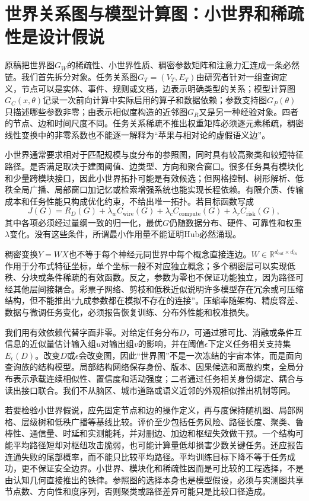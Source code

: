 \section{世界关系图与模型计算图：小世界和稀疏性是设计假说}

原稿把世界图$G_W$的稀疏性、小世界性质、稠密参数矩阵和注意力汇连成一条必然链。我们首先拆分对象。任务关系图$G_T=(V_T,E_T)$由研究者针对一组查询定义，节点可以是实体、事件、规则或文档，边表示明确类型的关系；模型计算图$G_C(x,\theta)$记录一次前向计算中实际启用的算子和数据依赖；参数支持图$G_P(\theta)$只描述哪些参数非零；由表示相似度构造的近邻图$G_R$又是另一种经验对象。四者的节点、边和时间尺度不同。任务关系稀疏不推出权重矩阵必须逐元素稀疏，稠密线性变换中的非零系数也不能逐一解释为“苹果与相对论的虚假语义边”。

小世界通常要求相对于匹配规模与度分布的参照图，同时具有较高聚类和较短特征路径。是否满足取决于建图阈值、边类型、方向和聚合窗口。很多任务具有模块化和少量跨模块接口，因此小世界拓扑可能是有效候选；但网格控制、树形解析、低秩全局广播、局部窗口加记忆或检索增强系统也能实现长程依赖。有限介质、传输成本和任务性能只构成优化约束，不给出唯一拓扑。若目标函数写成
\begin{equation}
 J(G)=R_{D}(G)+\lambda_w C_{\mathrm{wire}}(G)
 +\lambda_c C_{\mathrm{compute}}(G)+\lambda_r C_{\mathrm{risk}}(G),
\end{equation}
其中各项必须经过量纲一致的归一化，最优$G$仍随数据分布、硬件、可靠性和权重$\lambda$变化。没有这些条件，所谓最小作用量不能证明Hub必然涌现。

稠密变换$Y=WX$也不等于每个神经元同世界中每个概念直接连边。$W\in\mathbb{R}^{d_{out}\times d_{in}}$作用于分布式特征坐标，单个坐标一般不对应独立概念；多个稠密层可以实现低秩、分块或条件稀疏的有效函数。反之，参数为零也不保证功能独立，因为路径可经其他层间接耦合。彩票子网络、剪枝和低秩近似说明许多模型存在冗余或可压缩结构，但不能推出“九成参数都在模拟不存在的连接”。压缩率随架构、精度容差、数据与微调任务变化，必须报告恢复训练、分布外性能和校准损失。

我们用有效依赖代替字面非零。对给定任务分布$D$，可通过雅可比、消融或条件互信息的近似量估计输入组$u$对输出组$v$的影响，并在阈值$\epsilon$下定义任务相关支持集$E_\epsilon(D)$。改变$D$或$\epsilon$会改变图，因此“世界图”不是一次冻结的宇宙本体，而是面向查询族的结构模型。局部结构网络保存身份、版本、因果候选和离散约束，全局分布表示承载连续相似性、置信度和活动强度；二者通过任务相关身份绑定、耦合与读出接口联合。我们不从脑区、城市道路或语义近邻的外观相似推出机制等同。

若要检验小世界假说，应先固定节点和边的操作定义，再与度保持随机图、局部网格、层级树和低秩广播等基线比较。评价至少包括任务风险、路径长度、聚类、鲁棒性、通信量、时延和实测能耗，并对删边、加边和枢纽失效做干预。一个结构可能平均路径短却对枢纽攻击脆弱，也可能计算量低却损害少数关键任务。还应报告连通失败的尾部概率，而不能只比较平均路径。平均训练目标下降不等于任务成功，更不保证安全边界。小世界、模块化和稀疏性因而是可比较的工程选择，不是由认知几何直接推出的铁律。参照图的选择本身也是模型假设，必须与实测图共享节点数、方向性和度序列，否则聚类或路径差异可能只是比较口径造成。



